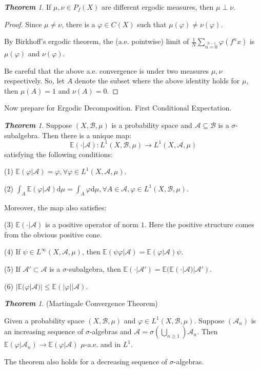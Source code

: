 \documentclass[10pt, a4paper, oneside]{report}
\numberwithin{equation}{chapter}
\theoremstyle{remark}
\newtheorem{theorem}[definition]{\bf{Theorem}}
\theoremstyle{remark}
\begin{document}
\begin{theorem}
    If $\mu,\nu\in P_f(X)$ are different ergodic measures, then $\mu\perp\nu.$
\end{theorem}

\begin{proof}
    Since $\mu\not=\nu$, there is a $\varphi\in C(X)$ such that $\mu(\varphi)\not=\nu(\varphi).$

    By Birkhoff's ergodic theorem, the (a.e. pointwise) limit of $\frac{1}{N}\sum\limits_{n=0}\limits^{N-1}\varphi(f^nx)$ is $\mu(\varphi)$ and $\nu(\varphi)$.

    Be careful that the above a.e. convergence is under two measures $\mu,\nu$ respectively. So, let $A$ denote the subset where the above identity holds for $\mu$, then $\mu(A)=1$ and $\nu(A)=0$.
\end{proof}

Now prepare for Ergodic Decomposition. First Conditional Expectation.

\begin{theorem}
    Suppose $(X,\mathcal{B},\mu)$ is a probability space and $\mathcal{A}\subseteq\mathcal{B}$ is a $\sigma$-subalgebra. Then there is a unique map:
    $$\mathbb{E}(\cdot|\mathcal{A}):L^1(X,\mathcal{B},\mu)\rightarrow L^1(X,\mathcal{A},\mu)$$
    satisfying the following conditions:

    (1) $\mathbb{E}(\varphi|\mathcal{A})=\varphi,\forall \varphi\in L^1(X,\mathcal{A},\mu)$.

    (2) $\int_A\mathbb{E}(\varphi|\mathcal{A})\mathrm{d}\mu=\int_A\varphi\mathrm{d}\mu,\forall A\in\mathcal{A},\varphi\in L^1(X,\mathcal{B},\mu).$

    Moreover, the map also satisfies:

    (3) $\mathbb{E}(\cdot|\mathcal{A})$ is a positive operator of norm $1$. Here the positive structure comes from the obvious positive cone.

    (4) If $\psi\in L^\infty(X,\mathcal{A},\mu)$, then $\mathbb{E}(\psi\varphi|\mathcal{A})=\mathbb{E}(\varphi|\mathcal{A})\psi$.

    (5) If $\mathcal{A}'\subset\mathcal{A}$ is a $\sigma$-subalgebra, then $\mathbb{E}(\cdot|\mathcal{A}')=\mathbb{E}(\mathbb{E}(\cdot|\mathcal{A})|\mathcal{A}')$.

    (6) $|\mathbb{E}(\varphi|\mathcal{A})|\leqslant \mathbb{E}(|\varphi||\mathcal{A}).$
\end{theorem}

\begin{theorem}
(Martingale Convergence Theorem)

    Given a probability space $(X,\mathcal{B},\mu)$ and $\varphi\in L^1(X,\mathcal{B},\mu)$. Suppose $(\mathcal{A}_n)$ is an increasing sequence of $\sigma$-algebras and $\mathcal{A}=\sigma(\bigcup\limits_{n\geqslant 1})\mathcal{A}_n$.
    Then $\mathbb{E}(\varphi|\mathcal{A}_n)\to \mathbb{E}(\varphi|\mathcal{A})$ $\mu$-a.e. and in $L^1$.

    The theorem also holds for a decreasing sequence of $\sigma$-algebras.
\end{theorem}
\end{document}
